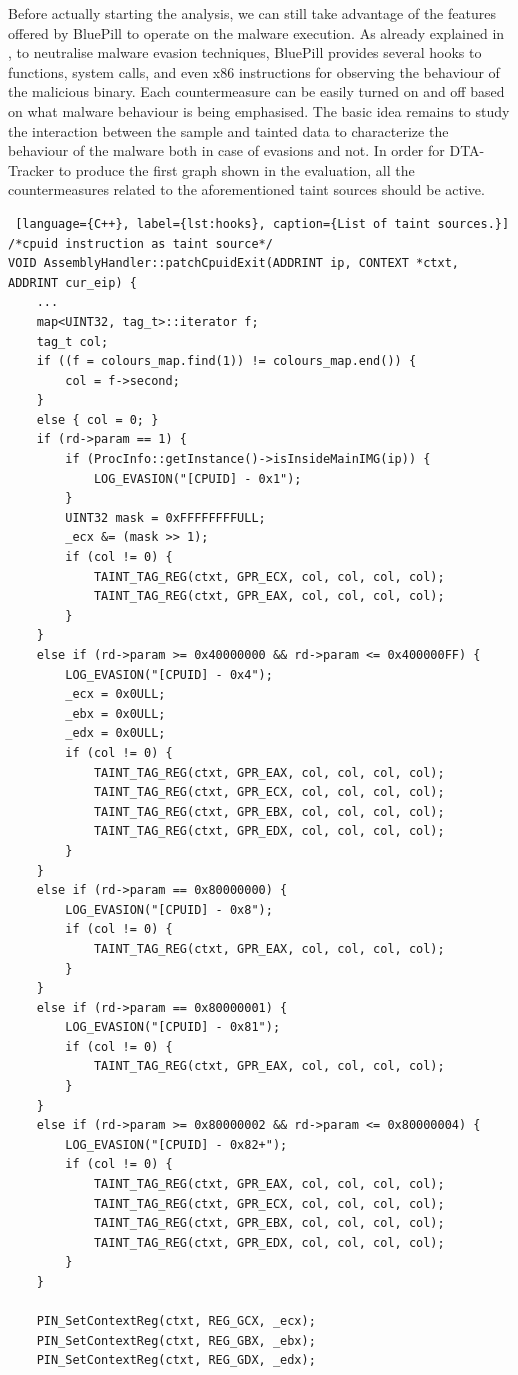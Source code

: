 \documentclass[LaM,binding=0.6cm]{sapthesis}
\begin{document}
\noindent
Before actually starting the analysis, we can still take advantage of the features offered by BluePill to operate on the malware execution. As already explained in , to neutralise malware evasion techniques, BluePill provides several hooks to functions, system calls, and even x$86$ instructions for observing the behaviour of the malicious binary. Each countermeasure can be easily turned on and off based on what malware behaviour is being emphasised. The basic idea remains to study the interaction between the sample and tainted data to characterize the behaviour of the malware both in case of evasions and not. In order for {\sf DTA-Tracker} to produce the first graph shown in the evaluation, all the countermeasures related to the aforementioned taint sources should be active.
\begin{lstlisting} [language={C++}, label={lst:hooks}, caption={List of taint sources.}]
/*cpuid instruction as taint source*/
VOID AssemblyHandler::patchCpuidExit(ADDRINT ip, CONTEXT *ctxt, ADDRINT cur_eip) {
	...
	map<UINT32, tag_t>::iterator f;
	tag_t col;
	if ((f = colours_map.find(1)) != colours_map.end()) {
		col = f->second;
	}
	else { col = 0; }
	if (rd->param == 1) {
		if (ProcInfo::getInstance()->isInsideMainIMG(ip)) {
			LOG_EVASION("[CPUID] - 0x1");
		}
		UINT32 mask = 0xFFFFFFFFULL;
		_ecx &= (mask >> 1);
		if (col != 0) {
			TAINT_TAG_REG(ctxt, GPR_ECX, col, col, col, col);
			TAINT_TAG_REG(ctxt, GPR_EAX, col, col, col, col);
		}
	}
	else if (rd->param >= 0x40000000 && rd->param <= 0x400000FF) {
		LOG_EVASION("[CPUID] - 0x4");
		_ecx = 0x0ULL;
		_ebx = 0x0ULL;
		_edx = 0x0ULL;
		if (col != 0) {
			TAINT_TAG_REG(ctxt, GPR_EAX, col, col, col, col);
			TAINT_TAG_REG(ctxt, GPR_ECX, col, col, col, col);
			TAINT_TAG_REG(ctxt, GPR_EBX, col, col, col, col);
			TAINT_TAG_REG(ctxt, GPR_EDX, col, col, col, col);
		}
	}
	else if (rd->param == 0x80000000) {
		LOG_EVASION("[CPUID] - 0x8");
		if (col != 0) {
			TAINT_TAG_REG(ctxt, GPR_EAX, col, col, col, col);
		}
	}
	else if (rd->param == 0x80000001) {
		LOG_EVASION("[CPUID] - 0x81");
		if (col != 0) {
			TAINT_TAG_REG(ctxt, GPR_EAX, col, col, col, col);
		}
	}
	else if (rd->param >= 0x80000002 && rd->param <= 0x80000004) {
		LOG_EVASION("[CPUID] - 0x82+");
		if (col != 0) {
			TAINT_TAG_REG(ctxt, GPR_EAX, col, col, col, col);
			TAINT_TAG_REG(ctxt, GPR_ECX, col, col, col, col);
			TAINT_TAG_REG(ctxt, GPR_EBX, col, col, col, col);
			TAINT_TAG_REG(ctxt, GPR_EDX, col, col, col, col);
		}
	}

	PIN_SetContextReg(ctxt, REG_GCX, _ecx);
	PIN_SetContextReg(ctxt, REG_GBX, _ebx);
	PIN_SetContextReg(ctxt, REG_GDX, _edx);


\end{lstlisting}
\end{document}
